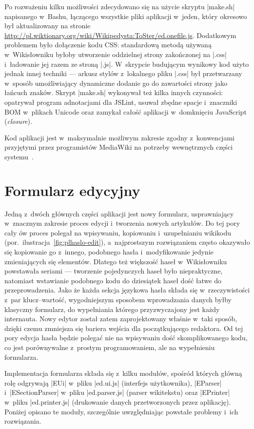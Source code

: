 Po rozważeniu kilku możliwości zdecydowano się na użycie skryptu \kod|make.sh| napisanego w~Bashu, łączącego wszystkie pliki aplikacji w~jeden, który okresowo był aktualizowany na stronie \url{http://pl.wiktionary.org/wiki/Wikipedysta:ToSter/ed.onefile.js}. Dodatkowym problemem było dołączenie kodu CSS: standardową metodą używaną w~Wikisłowniku byłoby utworzenie oddzielnej strony zakończonej na \kod|.css| i~ładowanie jej razem ze stroną \kod|.js|. W~skrypcie budującym wynikowy kod użyto jednak innej techniki --- arkusz stylów z~lokalnego pliku \kod|.css| był przetwarzany w~sposób umożliwiający dynamiczne dodanie go do zawartości strony jako łańcuch znaków. Skrypt \kod|make.sh| wykonywał też kilka innych czynności: opatrywał program adnotacjami dla JSLint, usuwał zbędne spacje i~znaczniki BOM w~plikach Unicode oraz zamykał całość aplikacji w~domknięciu JavaScript (\emph{closure}).

Kod aplikacji jest w~maksymalnie możliwym zakresie zgodny z~konwencjami przyjętymi przez programistów MediaWiki na potrzeby wewnętrznych części systemu~\cite{mw:conventions}.

\section{Formularz edycyjny}
\label{sec:impl-form}

Jedną z~dwóch głównych części aplikacji jest nowy formularz, usprawniający w~znacznym zakresie proces edycji i~tworzenia nowych artykułów. Do tej pory cały ów proces polegał na wpisywaniu, kopiowaniu i~uzupełnianiu wikikodu (por.~ilustracja~\ref{fig:plhaslo-edit}), a~najprostszym rozwiązaniem często okazywało się kopiowanie go z~innego, podobnego hasła i~modyfikowanie jedynie zmieniających się elementów. Dlatego też większość haseł w~Wikisłowniku powstawała seriami --- tworzenie pojedynczych haseł było niepraktyczne, natomiast wstawianie podobnego kodu do dziesiątek haseł dość łatwe do przeprowadzenia. Jako że każda sekcja językowa hasła składa się w~rzeczywistości z~par klucz--wartość, wygodniejszym sposobem wprowadzania danych byłby klasyczny formularz, do wypełniania którego przyzwyczajony jest każdy internauta. Nowy edytor został zatem zaprojektowany właśnie w~taki sposób, dzięki czemu zmniejsza się bariera wejścia dla początkującego redaktora. Od tej pory edycja hasła będzie polegać nie na wpisywaniu dość skomplikowanego kodu, co jest porównywalne z~prostym programowaniem, ale na wypełnieniu formularza.

Implementacja formularza składa się z~kilku modułów, spośród których główną rolę odgrywają \kod|EUi| w~pliku \kod|ed.ui.js| (interfejs użytkownika), \kod|EParser| i~\kod|ESectionParser| w~pliku \kod|ed.parser.js| (parser wikitekstu) oraz \kod|EPrinter| w~pliku \kod|ed.printer.js| (drukowanie danych przetworzonych przez aplikację). Poniżej opisano te moduły, szczególnie uwzględniając powstałe problemy i~ich rozwiązania.

